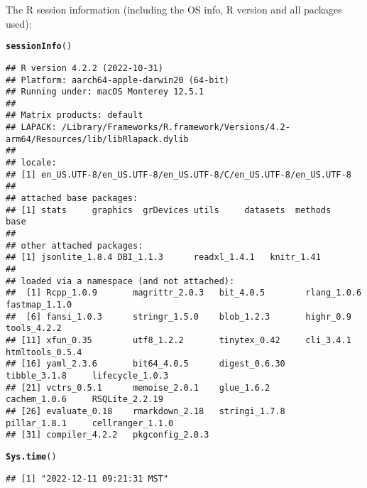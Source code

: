 \documentclass{article}\usepackage[]{graphicx}\usepackage[]{xcolor}
\makeatletter
\newcommand{\hlstd}[1]{\textcolor[rgb]{0.345,0.345,0.345}{#1}}%
\newcommand{\hlkwd}[1]{\textcolor[rgb]{0.737,0.353,0.396}{\textbf{#1}}}%
\newenvironment{kframe}{%
 \def\at@end@of@kframe{}%
 \ifinner\ifhmode%
  \def\at@end@of@kframe{\end{minipage}}%
  \begin{minipage}{\columnwidth}%
 \fi\fi%
 \def\FrameCommand##1{\hskip\@totalleftmargin \hskip-\fboxsep
 \colorbox{shadecolor}{##1}\hskip-\fboxsep
     \hskip-\linewidth \hskip-\@totalleftmargin \hskip\columnwidth}%
 \MakeFramed {\advance\hsize-\width
   \@totalleftmargin\z@ \linewidth\hsize
   \@setminipage}}%
 {\par\unskip\endMakeFramed%
 \at@end@of@kframe}
\newenvironment{knitrout}{}{} %
\makeatother
\begin{document}
The R session information (including the OS info, R version and all
packages used):

\begin{knitrout}
\color{fgcolor}\begin{kframe}
\begin{alltt}
\hlkwd{sessionInfo}\hlstd{()}
\end{alltt}
\begin{verbatim}
## R version 4.2.2 (2022-10-31)
## Platform: aarch64-apple-darwin20 (64-bit)
## Running under: macOS Monterey 12.5.1
## 
## Matrix products: default
## LAPACK: /Library/Frameworks/R.framework/Versions/4.2-arm64/Resources/lib/libRlapack.dylib
## 
## locale:
## [1] en_US.UTF-8/en_US.UTF-8/en_US.UTF-8/C/en_US.UTF-8/en_US.UTF-8
## 
## attached base packages:
## [1] stats     graphics  grDevices utils     datasets  methods   base     
## 
## other attached packages:
## [1] jsonlite_1.8.4 DBI_1.1.3      readxl_1.4.1   knitr_1.41    
## 
## loaded via a namespace (and not attached):
##  [1] Rcpp_1.0.9       magrittr_2.0.3   bit_4.0.5        rlang_1.0.6      fastmap_1.1.0   
##  [6] fansi_1.0.3      stringr_1.5.0    blob_1.2.3       highr_0.9        tools_4.2.2     
## [11] xfun_0.35        utf8_1.2.2       tinytex_0.42     cli_3.4.1        htmltools_0.5.4 
## [16] yaml_2.3.6       bit64_4.0.5      digest_0.6.30    tibble_3.1.8     lifecycle_1.0.3 
## [21] vctrs_0.5.1      memoise_2.0.1    glue_1.6.2       cachem_1.0.6     RSQLite_2.2.19  
## [26] evaluate_0.18    rmarkdown_2.18   stringi_1.7.8    pillar_1.8.1     cellranger_1.1.0
## [31] compiler_4.2.2   pkgconfig_2.0.3
\end{verbatim}
\begin{alltt}
\hlkwd{Sys.time}\hlstd{()}
\end{alltt}
\begin{verbatim}
## [1] "2022-12-11 09:21:31 MST"
\end{verbatim}
\end{kframe}
\end{knitrout}
\end{document}
